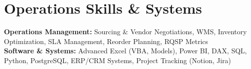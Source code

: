 \documentclass[10pt, a4paper]{article}
\begin{document}
\vspace{-2pt}

\section{Operations Skills \& Systems}

\noindent
\textbf{Operations Management:} Sourcing \& Vendor Negotiations, WMS, Inventory Optimization, SLA Management, Reorder Planning, RQSP Metrics \\[2pt]
\textbf{Software \& Systems:} Advanced Excel (VBA, Models), Power BI, DAX, SQL, Python, PostgreSQL, ERP/CRM Systems, Project Tracking (Notion, Jira)
\end{document}
